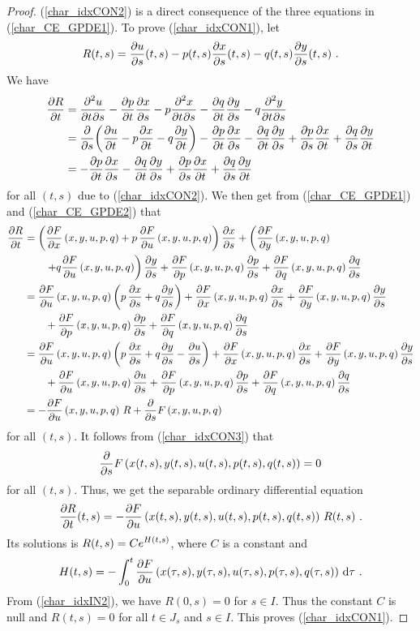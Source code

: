 \begin{proof}
(\ref{char_idxCON2}) is a direct consequence of the three equations in
(\ref{char_CE_GPDE1}).  To prove (\ref{char_idxCON1}), let
\[
R(t,s) = \pdydx{u}{s}(t,s) - p(t,s)\pdydx{x}{s}(t,s)
- q(t,s) \pdydx{y}{s}(t,s) \ . 
\]
We have
\begin{align*}
\pdydx{R}{t} &=
\pdydxnm{u}{t}{s}{2}{}{} - \pdydx{p}{t}\pdydx{x}{s}
- p\pdydxnm{x}{t}{s}{2}{}{} - \pdydx{q}{t}\pdydx{y}{s}
- q\pdydxnm{y}{t}{s}{2}{}{} \\
&= \pdfdx{ \left( \pdydx{u}{t} - p\pdydx{x}{t}
- q \pdydx{y}{t} \right)}{s}
- \pdydx{p}{t}\pdydx{x}{s} - \pdydx{q}{t}\pdydx{y}{s}
+ \pdydx{p}{s}\pdydx{x}{t} + \pdydx{q}{s}\pdydx{y}{t} \\
&= -\pdydx{p}{t}\pdydx{x}{s}
- \pdydx{q}{t}\pdydx{y}{s}
+ \pdydx{p}{s}\pdydx{x}{t}
+ \pdydx{q}{s}\pdydx{y}{t}
\end{align*}
for all $(t,s)$ due to (\ref{char_idxCON2}).  We then get from
(\ref{char_CE_GPDE1}) and (\ref{char_CE_GPDE2}) that
\begin{align*}
\pdydx{R}{t} &=  \left(\pdydx{F}{x}\left(x,y,u,p,q\right)
+ p\,\pdydx{F}{u}\left(x,y,u,p,q\right) \right)\pdydx{x}{s}
+\left(\pdydx{F}{y}\left(x,y,u,p,q\right) \right. \\
& \qquad \left. + q \pdydx{F}{u}\left(x,y,u,p,q\right) \right)\pdydx{y}{s}
+\pdydx{F}{p}\left(x,y,u,p,q\right)\pdydx{p}{s}
+\pdydx{F}{q}\left(x,y,u,p,q\right)\pdydx{q}{s} \\
&=\pdydx{F}{u}\left(x,y,u,p,q\right) \left(p\,\pdydx{x}{s}
+ q\pdydx{y}{s} \right)
+\pdydx{F}{x}\left(x,y,u,p,q\right)\pdydx{x}{s}
+\pdydx{F}{y}\left(x,y,u,p,q\right)\pdydx{y}{s} \\
&\qquad +\pdydx{F}{p}\left(x,y,u,p,q\right)\pdydx{p}{s}
+\pdydx{F}{q}\left(x,y,u,p,q\right)\pdydx{q}{s} \\
&=\pdydx{F}{u}\left(x,y,u,p,q\right) \left( p\,\pdydx{x}{s} +
q\pdydx{y}{s} - \pdydx{u}{s} \right)
+\pdydx{F}{x}\left(x,y,u,p,q\right)\pdydx{x}{s}
+\pdydx{F}{y}\left(x,y,u,p,q\right)\pdydx{y}{s} \\
&\qquad +\pdydx{F}{u}\left(x,y,u,p,q\right)\pdydx{u}{s}
+\pdydx{F}{p}\left(x,y,u,p,q\right)\pdydx{p}{s}
+\pdydx{F}{q}\left(x,y,u,p,q\right)\pdydx{q}{s} \\
&= - \pdydx{F}{u}\left(x,y,u,p,q\right) \,R +
\pdfdx{F\left(x,y,u,p,q\right)}{s}
\end{align*}
for all $(t,s)$.  It follows from (\ref{char_idxCON3}) that
\[
\pdfdx{F\left(x(t,s),y(t,s),u(t,s),p(t,s),q(t,s)\right)}{s} = 0
\]
for all $(t,s)$.  Thus, we get the separable ordinary differential equation
\[
\pdydx{R}{t}(t,s) =
-\pdydx{F}{u}\left(x(t,s),y(t,s),u(t,s),p(t,s),q(t,s)\right) \,R(t,s) \ .
\]
Its solutions is $\DS R(t,s) = C e^{H(t,s)}$, where $C$ is a
constant and
\[
H(t,s) = -\int_0^t
\pdydx{F}{u}\left(x(\tau,s),y(\tau,s),u(\tau,s),p(\tau,s),q(\tau,s)\right)
\dx{\tau} \ .
\]
From (\ref{char_idxIN2}), we have $R(0,s) = 0$ for $s \in I$.  Thus
the constant $C$ is null and $R(t,s) = 0$ for all $t \in J_s$ and
$s\in I$.  This proves (\ref{char_idxCON1}).


\end{proof}

